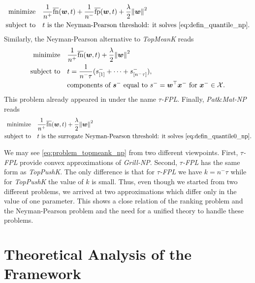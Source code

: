 \documentclass{Thesis}
\newcommand{\Brac}[2][r]{%
  \ifx r#1 \left(       #2 \right)       \else
  \ifx c#1 \left\{      #2 \right\}      \else
  \ifx s#1 \left[       #2 \right]       \else
  \ifx v#1 \left\vert   #2 \right\vert   \else
  \ifx a#1 \left\langle #2 \right\rangle \else
  \ifx t#1 \left\lceil  #2 \right\rceil  \else
  \ifx b#1 \left\lfloor #2 \right\rfloor \else
  \ifx n#1 \left\|      #2 \right\|      \else
  \mathrm{Illegal~option}%
  \fi\fi\fi\fi\fi\fi\fi\fi
}
\newcommand{\Xc}{\mathcal{X}}
\newcommand{\norm}[1]{\Brac[n]{#1}}
\newcommand{\minimize}{\operatorname*{minimize}}
\newcommand{\st}{\operatorname{subject\ to}}
\newcommand{\TopPushK}{\emph{TopPushK}\xspace}
\newcommand{\tauFPL}{{\emph{$\tau$-FPL}}\xspace}
\newcommand{\TopMeanK}{\emph{TopMeanK}\xspace}
\newcommand{\PatMatNP}{{\emph{Pat}\&\emph{Mat-NP}}\xspace}
\newcommand{\GrillNP}{\emph{Grill-NP}\xspace}
\newcommand{\fps}{\overline{\textnormal{fp}}}
\newcommand{\fns}{\overline{\textnormal{fn}}}
\begin{document}
\begin{equation}\label{eq:problem_grill_np}
  \begin{aligned}
  \minimize
  & \quad \frac{1}{n^{+}}\fns(\bm{w}, t) + \frac{1}{n^{-}}\fps(\bm{w}, t) + \frac{\lambda}{2}\norm{\bm{w}}^2\\
  \st
  & \quad t\text{ is the Neyman-Pearson threshold: it solves }\eqref{eq:defin_quantile_np}.
  \end{aligned}
\end{equation}
Similarly, the Neyman-Pearson alternative to \TopMeanK reads
\begin{equation}\label{eq:problem_topmeank_np}
  \begin{aligned}
  \minimize
  & \quad\frac{1}{n^{+}}\fns(\bm{w}, t) + \frac{\lambda}{2}\norm{\bm{w}}^2 \\
  \st
  & \quad t = \frac 1{n^ - \tau}(s_{[1]}^- + \dots + s_{[n^- \tau]}^-), \\
  & \quad \text{components of }\bm{s}^-\text{ equal to } s^- = \bm{w}^\top \bm{x}^-\text{ for }\bm{x}^- \in \Xc.
  \end{aligned}
\end{equation}
This problem already appeared in \cite{zhang2018tau} under the name \tauFPL. Finally, \PatMatNP reads
\begin{equation}\label{eq:problem_patmat_np}
  \begin{aligned}
  \minimize
  & \quad \frac{1}{n^{+}}\fns(\bm{w},t) + \frac{\lambda}{2}\norm{\bm{w}}^2\\
  \st
  & \quad t\text{ is the surrogate Neyman-Pearson threshold: it solves }\eqref{eq:defin_quantile0_np}.
  \end{aligned}
\end{equation}

We may see \eqref{eq:problem_topmeank_np} from two different viewpoints. First, \tauFPL provide convex approximations of \GrillNP. Second, \tauFPL has the same form as \TopPushK. The only difference is that for \tauFPL we have $k=n^-\tau$ while for \TopPushK the value of $k$ is small. Thus, even though we started from two different problems, we arrived at two approximations which differ only in the value of one parameter. This shows a close relation of the ranking problem and the Neyman-Pearson problem and the need for a unified theory to handle these problems.


\section{Theoretical Analysis of the Framework}\label{sec:theory}
\end{document}
